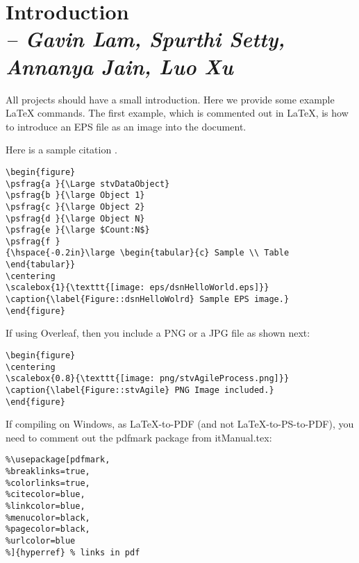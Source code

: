 \chapter{Introduction \\
\small{\textit{-- Gavin Lam, Spurthi Setty, Annanya Jain, Luo Xu}}
\label{Chapter::Introduction}}

 
All projects should have a small introduction.  Here we provide some
example LaTeX commands.  The first example, which is commented out in LaTeX,
is how to introduce an EPS file as an image into the document.

Here is a sample citation \cite{GM1998}.

\begin{verbatim}
\begin{figure}
\psfrag{a }{\Large stvDataObject}
\psfrag{b }{\large Object 1}
\psfrag{c }{\large Object 2}
\psfrag{d }{\large Object N}
\psfrag{e }{\large $Count:N$}
\psfrag{f }
{\hspace{-0.2in}\large \begin{tabular}{c} Sample \\ Table \end{tabular}}
\centering
\scalebox{1}{\texttt{[image: eps/dsnHelloWorld.eps]}}
\caption{\label{Figure::dsnHelloWolrd} Sample EPS image.}
\end{figure}
\end{verbatim}

\noindent
If using Overleaf, then you include a PNG or a JPG file as shown next:

\begin{verbatim}
\begin{figure}
\centering
\scalebox{0.8}{\texttt{[image: png/stvAgileProcess.png]}}
\caption{\label{Figure::stvAgile} PNG Image included.}
\end{figure}
\end{verbatim}


If compiling on Windows, as LaTeX-to-PDF (and not LaTeX-to-PS-to-PDF), 
you need to comment out the pdfmark package from itManual.tex:

\begin{verbatim}
%\usepackage[pdfmark, 
%breaklinks=true, 
%colorlinks=true,
%citecolor=blue,
%linkcolor=blue,
%menucolor=black,
%pagecolor=black,
%urlcolor=blue
%]{hyperref} % links in pdf
\end{verbatim}

